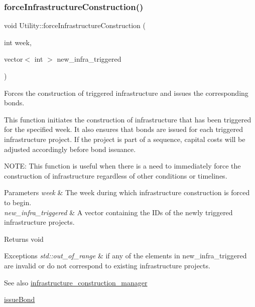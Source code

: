 \subsubsection{\texorpdfstring{force\+Infrastructure\+Construction()}{forceInfrastructureConstruction()}}
{\footnotesize\ttfamily void Utility\+::force\+Infrastructure\+Construction (\begin{DoxyParamCaption}\item[{int}]{week,  }\item[{vector$<$ int $>$}]{new\+\_\+infra\+\_\+triggered }\end{DoxyParamCaption})}



Forces the construction of triggered infrastructure and issues the corresponding bonds. 

This function initiates the construction of infrastructure that has been triggered for the specified week. It also ensures that bonds are issued for each triggered infrastructure project. If the project is part of a sequence, capital costs will be adjusted accordingly before bond issuance.

N\+O\+TE\+: This function is useful when there is a need to immediately force the construction of infrastructure regardless of other conditions or timelines.


\begin{DoxyParams}{Parameters}
{\em week} & The week during which infrastructure construction is forced to begin.\\
\hline
{\em new\+\_\+infra\+\_\+triggered} & A vector containing the I\+Ds of the newly triggered infrastructure projects.\\
\hline
\end{DoxyParams}
\begin{DoxyReturn}{Returns}
void
\end{DoxyReturn}

\begin{DoxyExceptions}{Exceptions}
{\em std\+::out\+\_\+of\+\_\+range} & if any of the elements in new\+\_\+infra\+\_\+triggered are invalid or do not correspond to existing infrastructure projects.\\
\hline
\end{DoxyExceptions}
\begin{DoxySeeAlso}{See also}
\mbox{\hyperlink{classUtility_a2eff94831dd7a4b7a4243ef69c5311d9}{infrastructure\+\_\+construction\+\_\+manager}} 

\mbox{\hyperlink{classUtility_a152ceea2917ea7715e8fbf8aff24390f}{issue\+Bond}} 
\end{DoxySeeAlso}
\mbox{\label{classUtility_a70f24df5a7d4346ad0ebccd9b30960d3}} 
